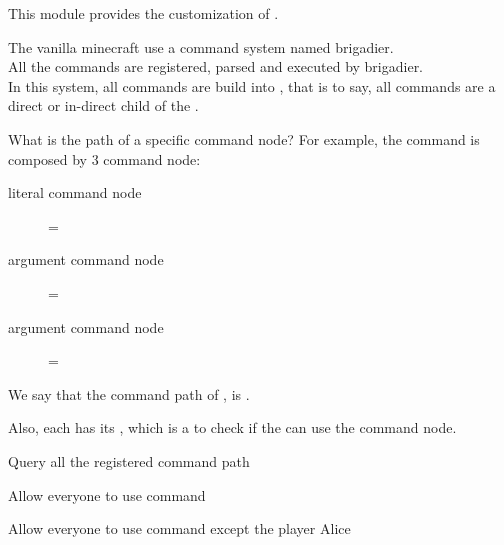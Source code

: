 \label{ch:command_permission}

This module provides the customization of .


The vanilla minecraft use a command system named brigadier.\\
All the commands are registered, parsed and executed by brigadier. \\
In this system, all commands are build into , that is to say, all commands are a direct or in-direct child of the .

\begin{example}{What is the path of a specific command node?}
    For example, the command  is composed by 3 command node:
    \begin{description}
        \item [literal command node] = 
        \item [argument command node] = 
        \item [argument command node] = 
    \end{description}
    We say that the command path of , is .
\end{example}

Also, each  has its , which is a  to check if the  can use the command node.

\begin{tips}{Query all the registered command path}
\end{tips}

\begin{example}{Allow everyone to use  command}
\end{example}

\begin{example}{Allow everyone to use  command except the player Alice}
    \\
\end{example}

